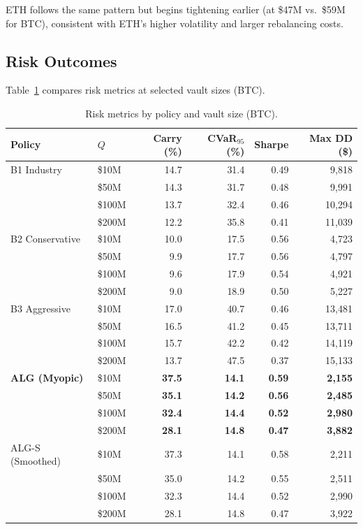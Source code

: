 \documentclass[11pt]{article}
\newcommand{\multirow}[3]{#3}
\begin{document}
ETH follows the same pattern but begins tightening earlier (at \$47M vs.\ \$59M for BTC), consistent with ETH's higher volatility and larger rebalancing costs.

\subsection{Risk Outcomes}

Table~\ref{tab:risk} compares risk metrics at selected vault sizes (BTC).

\begin{table}[htbp]
\centering
\caption{Risk metrics by policy and vault size (BTC).}
\label{tab:risk}
\begin{tabular}{llrrrr}
\toprule
Policy & $Q$ & Carry (\%) & CVaR$_{95}$ (\%) & Sharpe & Max DD (\$) \\
\midrule
\multirow{4}{*}{B1 Industry}
& \$10M & 14.7 & 31.4 & 0.49 & 9,818 \\
& \$50M & 14.3 & 31.7 & 0.48 & 9,991 \\
& \$100M & 13.7 & 32.4 & 0.46 & 10,294 \\
& \$200M & 12.2 & 35.8 & 0.41 & 11,039 \\
\midrule
\multirow{4}{*}{B2 Conservative}
& \$10M & 10.0 & 17.5 & 0.56 & 4,723 \\
& \$50M & 9.9 & 17.7 & 0.56 & 4,797 \\
& \$100M & 9.6 & 17.9 & 0.54 & 4,921 \\
& \$200M & 9.0 & 18.9 & 0.50 & 5,227 \\
\midrule
\multirow{4}{*}{B3 Aggressive}
& \$10M & 17.0 & 40.7 & 0.46 & 13,481 \\
& \$50M & 16.5 & 41.2 & 0.45 & 13,711 \\
& \$100M & 15.7 & 42.2 & 0.42 & 14,119 \\
& \$200M & 13.7 & 47.5 & 0.37 & 15,133 \\
\midrule
\multirow{4}{*}{\textbf{ALG (Myopic)}}
& \$10M & \textbf{37.5} & \textbf{14.1} & \textbf{0.59} & \textbf{2,155} \\
& \$50M & \textbf{35.1} & \textbf{14.2} & \textbf{0.56} & \textbf{2,485} \\
& \$100M & \textbf{32.4} & \textbf{14.4} & \textbf{0.52} & \textbf{2,980} \\
& \$200M & \textbf{28.1} & \textbf{14.8} & \textbf{0.47} & \textbf{3,882} \\
\midrule
\multirow{4}{*}{ALG-S (Smoothed)}
& \$10M & 37.3 & 14.1 & 0.58 & 2,211 \\
& \$50M & 35.0 & 14.2 & 0.55 & 2,511 \\
& \$100M & 32.3 & 14.4 & 0.52 & 2,990 \\
& \$200M & 28.1 & 14.8 & 0.47 & 3,922 \\
\bottomrule
\end{tabular}
\end{table}
\end{document}
